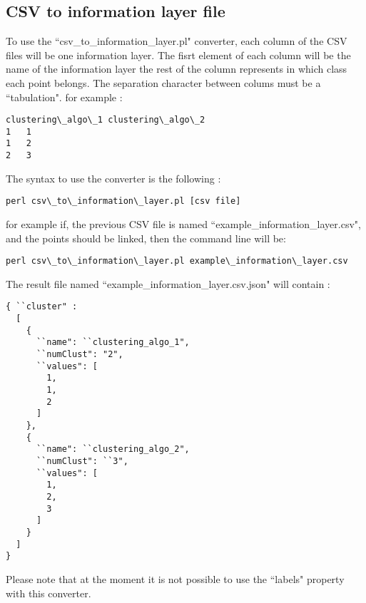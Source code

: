 \documentclass{bioinfo}
\begin{document}
\subsection{CSV to information layer file}
To use the ``csv\_to\_information\_layer.pl" converter, each column of the CSV files will be one information layer. The fisrt element of each column will be the name of the information layer the rest of the column represents in which class each point belongs. The separation character between colums must be a ``tabulation". for example :
\begin{lstlisting}
clustering\_algo\_1	clustering\_algo\_2
1	1
1	2
2	3
\end{lstlisting}
The syntax to use the converter is the following :
\begin{lstlisting}
perl csv\_to\_information\_layer.pl [csv file]
\end{lstlisting}
for example if, the previous CSV file is named ``example_information_layer.csv", and the points should be linked, then the command line will be:
\begin{lstlisting}
perl csv\_to\_information\_layer.pl example\_information\_layer.csv
\end{lstlisting}
The result file named ``example\_information\_layer.csv.json" will contain :
\begin{lstlisting}
{ ``cluster" :
  [
    {
      ``name": ``clustering_algo_1",
      ``numClust": "2",
      ``values": [
        1,
        1,
        2
      ]
    },
    {
      ``name": ``clustering_algo_2",
      ``numClust": ``3",
      ``values": [
        1,
        2,
        3
      ]
    }
  ]
}
\end{lstlisting}
Please note that at the moment it is not possible to use the ``labels" property with this converter. 
\end{document}
